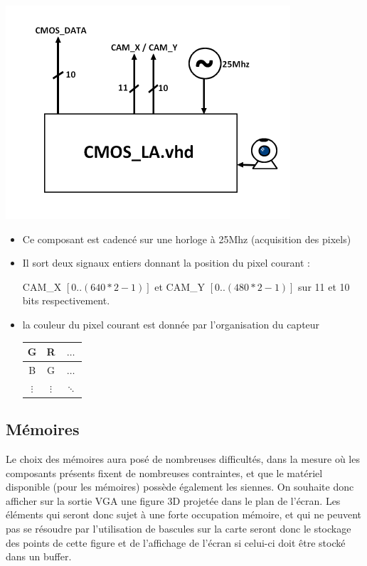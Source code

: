 \documentclass[10pt,a4paper]{report}
\begin{document}
\includegraphics[width=300pt]{gfx/cmos_la.png}
\begin{itemize}
\item Ce composant est cadencé sur une horloge à 25Mhz (acquisition des pixels)
\item Il sort deux signaux entiers donnant la position du pixel courant :

CAM\_X $\left[ 0 .. (640*2-1) \right]$ et CAM\_Y $\left[ 0 .. (480*2-1) \right]$ sur 11 et 10 bits respectivement.
\item la couleur du pixel courant est donnée par l'organisation du capteur

\begin{center}
\begin{tabular}{|c|c|c|}
\hline 
G & R & $\ldots$ \\ 
\hline 
B & G & $\ldots$ \\ 
\hline 
$\vdots$ & $\vdots$ & $\ddots$  \\ 
\hline 
\end{tabular} 
\end{center}

\end{itemize}

\subsection{Mémoires}
Le choix des mémoires aura posé de nombreuses difficultés, dans la mesure où les composants présents fixent de nombreuses contraintes, et que le matériel disponible (pour les mémoires) possède également les siennes.
On souhaite donc afficher sur la sortie VGA une figure 3D projetée dans le plan de l'écran. Les éléments qui seront donc sujet à une forte occupation mémoire, et qui ne peuvent pas se résoudre par l'utilisation de bascules sur la carte seront donc le stockage des points de cette figure et de l'affichage de l'écran si celui-ci doit être stocké dans un buffer.
\end{document}
